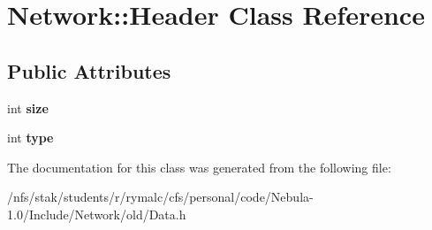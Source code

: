 \hypertarget{classNetwork_1_1Header}{
\section{Network::Header Class Reference}
\label{classNetwork_1_1Header}
}
\subsection*{Public Attributes}
\begin{DoxyCompactItemize}
\item 
\hypertarget{classNetwork_1_1Header_a7dec7c57697b8ff06d5b7b40ffcf65ef}{
int {\bfseries size}}
\label{classNetwork_1_1Header_a7dec7c57697b8ff06d5b7b40ffcf65ef}

\item 
\hypertarget{classNetwork_1_1Header_a8caf02fb08930a0b483488cdaf84e565}{
int {\bfseries type}}
\label{classNetwork_1_1Header_a8caf02fb08930a0b483488cdaf84e565}

\end{DoxyCompactItemize}


The documentation for this class was generated from the following file:\begin{DoxyCompactItemize}
\item 
/nfs/stak/students/r/rymalc/cfs/personal/code/Nebula-\/1.0/Include/Network/old/Data.h\end{DoxyCompactItemize}
